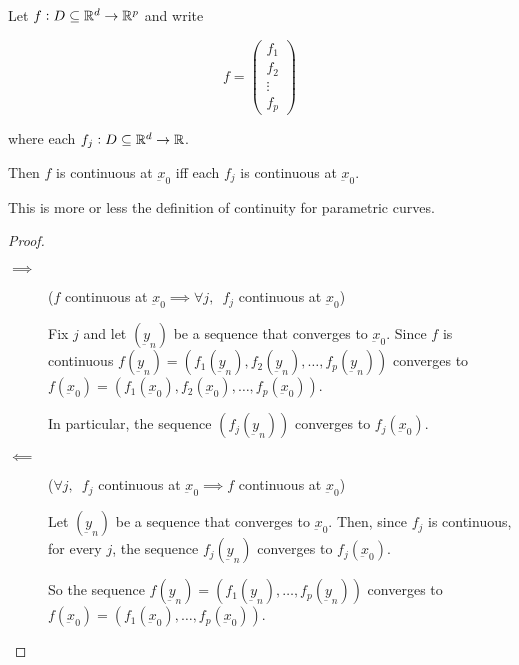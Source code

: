 \documentclass[12pt]{report}
\renewcommand{\vec}[1]{\underbar{\ensuremath{#1}}}
\begin{document}
\begin{proposition}
    Let $f: D \subseteq \mathbb{R}^d \to \mathbb{R}^p$ and write

    $$
        f = \begin{pmatrix}
            f_1    \\
            f_2    \\
            \vdots \\
            f_p
        \end{pmatrix}
    $$

    where each $f_j : D \subseteq \mathbb{R}^d \to \mathbb{R}$.

    Then $f$ is continuous at $\vec{x}_0$ iff each $f_j$ is continuous at $\vec{x}_0$.
\end{proposition}

\begin{remark}
    This is more or less the definition of continuity for parametric curves.
\end{remark}

\begin{proof}
    \skiplineafterproof
    \begin{description}
        \item[$\implies$] ($f$ continuous at $\vec{x}_0 \implies \forall j, \enspace f_j$ continuous at $\vec{x}_0$)

            Fix $j$ and let $\left(\vec{y}_n\right)$ be a sequence that converges to $\vec{x}_0$.
            Since $f$ is continuous $f(\vec{y}_n) = \left(f_1(\vec{y}_n), f_2(\vec{y}_n), \ldots, f_p(\vec{y}_n)\right)$ converges to $f(\vec{x}_0) = \left(f_1(\vec{x}_0), f_2(\vec{x}_0), \ldots, f_p(\vec{x}_0)\right)$.

            In particular, the sequence $\left(f_j(\vec{y}_n)\right)$ converges to $f_j(\vec{x}_0)$.

        \item[$\impliedby$] ($\forall j, \enspace f_j$ continuous at $\vec{x}_0 \implies f$ continuous at $\vec{x}_0$)

            Let $\left(\vec{y}_n\right)$ be a sequence that converges to $\vec{x}_0$. Then, since $f_j$ is continuous, for every $j$, the sequence $f_j(\vec{y}_n)$ converges to $f_j(\vec{x}_0)$.

            So the sequence $f(\vec{y}_n) = \left(f_1(\vec{y}_n), \ldots, f_p(\vec{y}_n)\right)$ converges to $f(\vec{x}_0) = \left(f_1(\vec{x}_0), \ldots, f_p(\vec{x}_0)\right)$.
    \end{description}
\end{proof}
\end{document}
